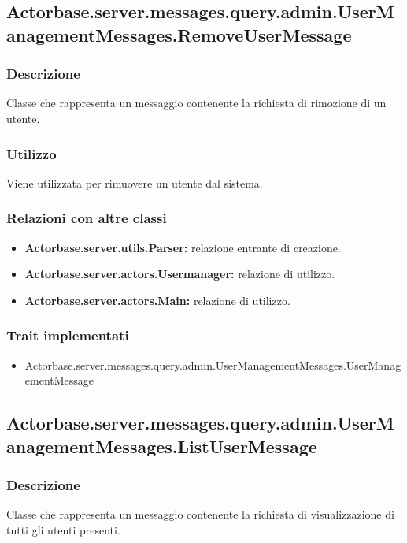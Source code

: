 \documentclass[a4paper]{article}
\begin{document}
		\subsection{Actorbase.server.messages.query.admin.UserManagementMessages.RemoveUserMessage}
			\subsubsection{Descrizione}
				Classe che rappresenta un messaggio contenente la richiesta di rimozione di un utente.
				
			\subsubsection{Utilizzo}
				Viene utilizzata per rimuovere un utente dal sistema.
				
			\subsubsection{Relazioni con altre classi}
				\begin{itemize}
					\item \textbf{Actorbase.server.utils.Parser:} relazione entrante di creazione.
					\item \textbf{Actorbase.server.actors.Usermanager:} relazione di utilizzo.
					\item \textbf{Actorbase.server.actors.Main:} relazione di utilizzo.
				\end{itemize}
			\subsubsection{Trait implementati}
				\begin{itemize}
					\item Actorbase.server.messages.query.admin.UserManagementMessages.UserManagementMessage
				\end{itemize}
				
		\subsection{Actorbase.server.messages.query.admin.UserManagementMessages.ListUserMessage}
			\subsubsection{Descrizione}
				Classe che rappresenta un messaggio contenente la richiesta di visualizzazione di tutti gli utenti presenti.
				
\end{document}

